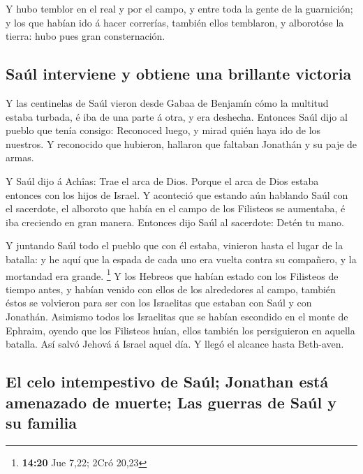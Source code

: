  Y hubo temblor en el real y por el campo, y entre toda la
gente de la guarnición; y los que habían ido á hacer correrías, también
ellos temblaron, y alborotóse la tierra: hubo pues gran consternación.

\hypertarget{sauxfal-interviene-y-obtiene-una-brillante-victoria}{%
\subsection{Saúl interviene y obtiene una brillante
victoria}\label{sauxfal-interviene-y-obtiene-una-brillante-victoria}}

 Y las centinelas de Saúl vieron desde Gabaa de Benjamín
cómo la multitud estaba turbada, é iba de una parte á otra, y era
deshecha.  Entonces Saúl dijo al pueblo que tenía consigo:
Reconoced luego, y mirad quién haya ido de los nuestros. Y reconocido
que hubieron, hallaron que faltaban Jonathán y su paje de armas.

 Y Saúl dijo á Achîas: Trae el arca de Dios. Porque el arca
de Dios estaba entonces con los hijos de Israel.  Y
aconteció que estando aún hablando Saúl con el sacerdote, el alboroto
que había en el campo de los Filisteos se aumentaba, é iba creciendo en
gran manera. Entonces dijo Saúl al sacerdote: Detén tu mano.

 Y juntando Saúl todo el pueblo que con él estaba, vinieron
hasta el lugar de la batalla: y he aquí que la espada de cada uno era
vuelta contra su compañero, y la mortandad era grande. \footnote{\textbf{14:20}
  Jue 7,22; 2Cró 20,23}  Y los Hebreos que habían estado
con los Filisteos de tiempo antes, y habían venido con ellos de los
alrededores al campo, también éstos se volvieron para ser con los
Israelitas que estaban con Saúl y con Jonathán.  Asimismo
todos los Israelitas que se habían escondido en el monte de Ephraim,
oyendo que los Filisteos huían, ellos también los persiguieron en
aquella batalla.  Así salvó Jehová á Israel aquel día. Y
llegó el alcance hasta Beth-aven.

\hypertarget{el-celo-intempestivo-de-sauxfal-jonathan-estuxe1-amenazado-de-muerte-las-guerras-de-sauxfal-y-su-familia}{%
\subsection{El celo intempestivo de Saúl; Jonathan está amenazado de
muerte; Las guerras de Saúl y su
familia}\label{el-celo-intempestivo-de-sauxfal-jonathan-estuxe1-amenazado-de-muerte-las-guerras-de-sauxfal-y-su-familia}}

